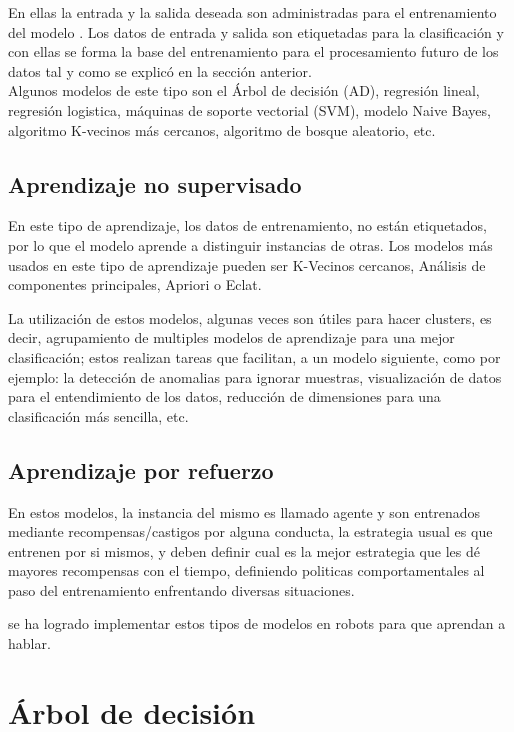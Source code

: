 \documentclass[twoside,spanish,ESP,MSc]{plantillaLabUPV}
\theoremstyle{definition}
\begin{document}
En ellas la entrada y la salida deseada son administradas para el entrenamiento del modelo  \cite{classifs}. Los datos de entrada y salida son etiquetadas para la clasificación y con ellas se forma la base del entrenamiento para el procesamiento futuro de los datos tal y como se explicó en la sección anterior.\\

Algunos modelos de este tipo son el Árbol de decisión (AD), regresión lineal, regresión logistica, máquinas de soporte vectorial (SVM), modelo Naive Bayes, algoritmo K-vecinos más cercanos, algoritmo de bosque aleatorio, etc.


\subsection{Aprendizaje no supervisado}

En este tipo de aprendizaje, los datos de entrenamiento, no están etiquetados, por lo que el modelo aprende a distinguir instancias de otras. Los modelos más usados en este tipo de aprendizaje pueden ser K-Vecinos cercanos, Análisis de componentes principales, Apriori o Eclat.

La utilización de estos modelos, algunas veces son útiles para hacer clusters, es decir, agrupamiento de multiples modelos de aprendizaje para una mejor clasificación; estos realizan tareas que facilitan, a un modelo siguiente, como por ejemplo: la detección de anomalias para ignorar muestras, visualización de datos para el entendimiento de los datos, reducción de dimensiones para una clasificación más sencilla, etc.

\subsection{Aprendizaje por refuerzo}

En estos modelos, la instancia del mismo es llamado agente y son entrenados mediante recompensas/castigos por alguna conducta, la estrategia usual es que entrenen por si mismos, y deben definir cual es la mejor estrategia que les dé mayores recompensas con el tiempo, definiendo politicas comportamentales al paso del entrenamiento enfrentando diversas situaciones.

se ha logrado implementar estos tipos de modelos en robots para que aprendan a hablar.


\section{Árbol de decisión}
\end{document}
